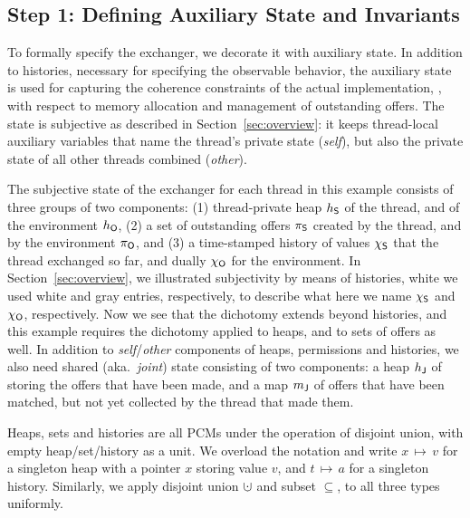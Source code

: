 \subsection{Step 1: Defining Auxiliary State and Invariants}

%
%

To formally specify the exchanger, we decorate it with auxiliary
state. 
%
In addition to histories, necessary for specifying the observable
behavior, the auxiliary state is used for capturing the coherence
constraints of the actual implementation, \eg, with respect to memory
allocation and management of outstanding offers.
%
The state is subjective as described in Section~\ref{sec:overview}: it
keeps thread-local auxiliary variables that name the thread's private
state (\emph{self}), but also the private state of all other threads
combined (\emph{other}).
%

The subjective state of the exchanger for each thread in this example
consists of three groups of two components: (1) thread-private heap
$h_{\mathsf{S}}$ of the thread, and of the environment $h_{\mathsf{O}}$, (2) a set of
outstanding offers $\pi_{\mathsf{S}}$ created by the thread, and by the
environment $\pi_{\mathsf{O}}$, and (3) a time-stamped history of values
$\chi_{\mathsf{S}}$ that the thread exchanged so far, and dually $\chi_{\mathsf{O}}$ for the
environment. In Section~\ref{sec:overview}, we illustrated
subjectivity by means of histories, white we used white and gray
entries, respectively, to describe what here we name $\chi_{\mathsf{S}}$ and
$\chi_{\mathsf{O}}$, respectively. Now we see that the dichotomy extends beyond
histories, and this example requires the dichotomy applied to heaps,
and to sets of offers as well. In addition to \emph{self}/\emph{other}
components of heaps, permissions and histories, we also need shared
(aka.~\emph{joint}) state consisting of two components: a heap
$h_{\mathsf{J}}$ of storing the offers that have been made, and a map
${m_{\mathsf{J}}}$ of offers that have been matched, but not yet collected by
the thread that made them.

Heaps, sets and histories are all PCMs under the operation of disjoint
union, with empty heap/set/history as a unit. We overload the notation
and write $x\,{\mapsto}\,v$ for a singleton heap with a pointer $x$
storing value $v$, and $t\,{\mapsto}\,a$ for a singleton
history. Similarly, we apply disjoint union $\hunion$ and subset
$\subseteq$, to all three types uniformly.

